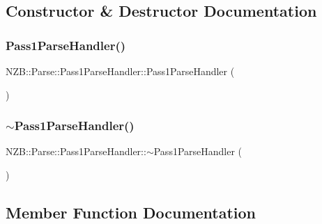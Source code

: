 \subsection{Constructor \& Destructor Documentation}
\hypertarget{class_n_z_b_1_1_parse_1_1_pass1_parse_handler_a1be458058a48e975914ed8f418828a6b}{}\label{class_n_z_b_1_1_parse_1_1_pass1_parse_handler_a1be458058a48e975914ed8f418828a6b} 
\subsubsection{\texorpdfstring{Pass1\+Parse\+Handler()}{Pass1ParseHandler()}}
{\footnotesize\ttfamily N\+Z\+B\+::\+Parse\+::\+Pass1\+Parse\+Handler\+::\+Pass1\+Parse\+Handler (\begin{DoxyParamCaption}{ }\end{DoxyParamCaption})}

\hypertarget{class_n_z_b_1_1_parse_1_1_pass1_parse_handler_a1dbe3658043ecc45b5fc8aabf923ebf8}{}\label{class_n_z_b_1_1_parse_1_1_pass1_parse_handler_a1dbe3658043ecc45b5fc8aabf923ebf8} 
\subsubsection{\texorpdfstring{$\sim$\+Pass1\+Parse\+Handler()}{~Pass1ParseHandler()}}
{\footnotesize\ttfamily N\+Z\+B\+::\+Parse\+::\+Pass1\+Parse\+Handler\+::$\sim$\+Pass1\+Parse\+Handler (\begin{DoxyParamCaption}{ }\end{DoxyParamCaption})\hspace{0.3cm}{\ttfamily [inline]}}



\subsection{Member Function Documentation}
\hypertarget{class_n_z_b_1_1_parse_1_1_pass1_parse_handler_afbdd1eaa80a10f66cba06a260fd9e7a1}{}\label{class_n_z_b_1_1_parse_1_1_pass1_parse_handler_afbdd1eaa80a10f66cba06a260fd9e7a1} 

